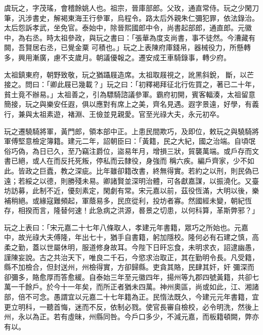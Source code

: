 
\begin{pinyinscope}

 虞玩之，字茂瑤，會稽餘姚人也。祖宗，晉庫部郎。父玫，通直常侍。玩之少閑刀筆，汎涉書史，解褐東海王行參軍，烏程令。路太后外親朱仁彌犯罪，依法錄治。太后怨訴孝武，坐免官。泰始中，除晉熙國郎中令，尚書起部郎，通直郎。元徽中，為右丞。時太祖參政，與玩之書曰：「張華為度支尚書，事不徒然。今漕藏有闕，吾賢居右丞，已覺金粟
 可積也。」玩之上表陳府庫錢帛，器械役力，所懸轉多，興用漸廣，慮不支歲月。朝議優報之。遷安成王車騎錄事，轉少府。



 太祖鎮東府，朝野致敬，玩之猶躡屐造席。太祖取屐視之，訛黑斜銳，斷，以芒接之。問曰：「卿此屐已幾載？」玩之曰：「初釋褐拜征北行佐買之，著已二十年，貧土竟不辦易。」太祖善之，引為驃騎諮議參軍。霸府初開，賓客輻湊，太祖留意簡接，玩之與樂安任遐，俱以應對有席上之美，齊名見遇。遐字景遠，好學，有義行，兼與太祖素遊，褚淵、王儉並見親愛。官至光祿大夫，永元初卒。



 玩之遷驍騎將軍，黃門郎，領本部中正。上患民間欺巧，及即位，敕玩之與驍騎將軍傅堅意檢定簿籍。建元二年，詔朝臣曰：「黃籍，民之大紀，國之治端。自頃氓俗巧偽，為日已久，至乃竊注爵位，盜易年月，增損三狀，貿襲萬端。或戶存而文書已絕，或人在而反托死叛，停私而云隸役，身強而
 稱六疾。編戶齊家，少不如此。皆政之巨蠹，教之深疵。比年雖卻籍改書，終無得實。若約之以刑，則民偽已遠；若綏之以德，則勝殘未易。卿諸賢並深明治體，可各獻嘉謀，以振澆化。又臺坊訪募，此制不近，優刻素定，閑劇有常。宋元嘉以前，茲役恆滿，大明以後，樂補稍絕。或緣寇難頻起，軍蔭易多，民庶從利，投坊者寡。然國經未變，朝紀恆存，相揆而言，隆替何速！此急病之洪源，晷景之切患，以何科算，革斯弊邪？」



 玩之上表曰：「宋元嘉二十七年八條取人，孝建元年書籍，眾巧之所始也。元嘉中，故光祿大夫傅隆，年出七十，猶手自書籍，躬加隱校。隆何必有石建之慎，高柔之勤，蓋以世屬休明，服道修身故耳。今陛下日旰忘食，未明求衣，詔逮幽愚，謹陳妄說。古之共治天下，唯良二千石，今慾求治取正，其在勤明令長。凡受籍，縣不加檢合，但封送州，州檢得實，方卻歸縣。吏貪其賂，民肆其奸，奸
 彌深而卻彌多，賂愈厚而答愈緩。自泰始三年至元徽四年，揚州等九郡四號黃籍，共卻七萬一千餘戶。於今十一年矣，而所正者猶未四萬。神州奧區，尚或如此，江、湘諸部，倍不可念。愚謂宜以元嘉二十七年籍為正。民惰法既久，今建元元年書籍，宜更立明科，一聽首悔，迷而不反，依制必戮。使官長審自檢校，必令明洗，然後上州，永以為正。若有虛昧，州縣同咎。今戶口多少，不減元嘉，而板籍頓闕，弊亦有以。




\end{pinyinscope}
